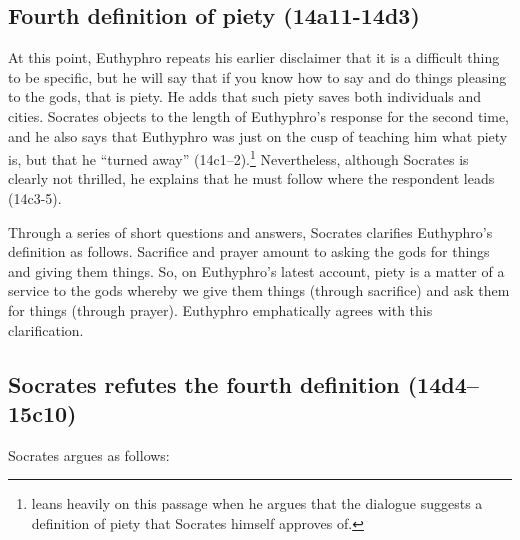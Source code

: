 \documentclass[11pt]{article}
\begin{document}

\subsection{Fourth definition of piety (14a11-14d3)}

At this point, Euthyphro repeats his earlier disclaimer that it is a difficult thing to be specific, but he will say that if you know how to say and do things pleasing to the gods, that is piety.  He adds that such piety saves both individuals and cities.  Socrates objects to the length of Euthyphro's response for the second time, and he also says that Euthyphro was just on the cusp of teaching him what piety is, but that he ``turned away'' (14c1--2).\footnote{\citet{mcpherran1992} leans heavily on this passage when he argues that the dialogue suggests a definition of piety that Socrates himself approves of.}  Nevertheless, although Socrates is clearly not thrilled, he explains that he must follow where the respondent leads (14c3-5).

Through a series of short questions and answers, Socrates clarifies Euthyphro's definition as follows.  Sacrifice and prayer amount to asking the gods for things and giving them things.  So, on Euthyphro's latest account, piety is a matter of a service to the gods whereby we give them things (through sacrifice) and ask them for things (through prayer).  Euthyphro emphatically agrees with this clarification.


\subsection{Socrates refutes the fourth definition (14d4--15c10)}

Socrates argues as follows:
\end{document}
